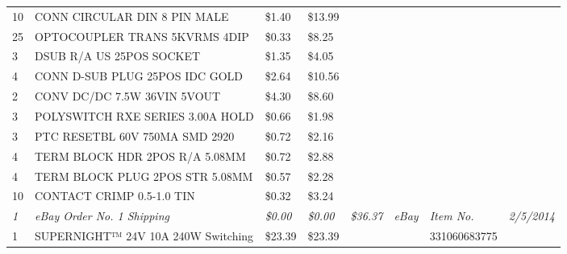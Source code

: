 \begin{table}[h]
{\begin{tabular}{llllllll}
10           & CONN CIRCULAR DIN 8 PIN MALE                      & \$1.40           & \$13.99          &                   &                   &                       &                     \\
25           & OPTOCOUPLER TRANS 5KVRMS 4DIP                     & \$0.33           & \$8.25           &                   &                   &                       &                     \\
3            & DSUB R/A US 25POS SOCKET                          & \$1.35           & \$4.05           &                   &                   &                       &                     \\
4            & CONN D-SUB PLUG 25POS IDC GOLD                    & \$2.64           & \$10.56          &                   &                   &                       &                     \\
2            & CONV DC/DC 7.5W 36VIN 5VOUT                       & \$4.30           & \$8.60           &                   &                   &                       &                     \\
3            & POLYSWITCH RXE SERIES 3.00A HOLD                  & \$0.66           & \$1.98           &                   &                   &                       &                     \\
3            & PTC RESETBL 60V 750MA SMD 2920                    & \$0.72           & \$2.16           &                   &                   &                       &                     \\
4            & TERM BLOCK HDR 2POS R/A 5.08MM                    & \$0.72           & \$2.88           &                   &                   &                       &                     \\
4            & TERM BLOCK PLUG 2POS STR 5.08MM                   & \$0.57           & \$2.28           &                   &                   &                       &                     \\
10           & CONTACT CRIMP 0.5-1.0 TIN                         & \$0.32           & \$3.24           &                   &                   &                       &                     \\  \hline \hline
\textit{1}   & \textit{eBay Order No. 1 Shipping}                & \textit{\$0.00}  & \textit{\$0.00}  & \textit{\$36.37}  & \textit{eBay}     & \textit{Item No.}     & \textit{2/5/2014}   \\
1            & SUPERNIGHT™ 24V 10A 240W Switching                & \$23.39          & \$23.39          &                   &                   & 331060683775          &                     \\

\end{tabular}}
\end{table}
